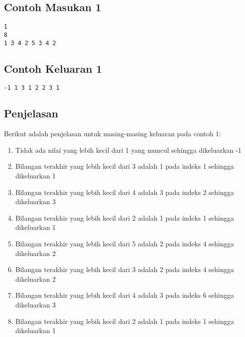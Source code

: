 \documentclass{article}
\begin{document}
\begin{multicols}{2}
\subsection*{Contoh Masukan 1}
\begin{lstlisting}
1
8
1 3 4 2 5 3 4 2
\end{lstlisting}
\columnbreak
\subsection*{Contoh Keluaran 1}
\begin{lstlisting}
-1 1 3 1 2 2 3 1
\end{lstlisting}
\vfill
\null
\end{multicols}


\subsection*{Penjelasan}

Berikut adalah penjelasan untuk masing-masing keluaran pada contoh 1:

\begin{enumerate}
\item Tidak ada nilai yang lebih kecil dari 1 yang muncul sehingga dikeluarkan -1
\item Bilangan terakhir yang lebih kecil dari 3 adalah 1 pada indeks 1 sehingga dikeluarkan 1
\item Bilangan terakhir yang lebih kecil dari 4 adalah 3 pada indeks 2 sehingga dikeluarkan 3
\item Bilangan terakhir yang lebih kecil dari 2 adalah 1 pada indeks 1 sehingga dikeluarkan 1
\item Bilangan terakhir yang lebih kecil dari 5 adalah 2 pada indeks 4 sehingga dikeluarkan 2
\item Bilangan terakhir yang lebih kecil dari 3 adalah 2 pada indeks 4 sehingga dikeluarkan 2
\item Bilangan terakhir yang lebih kecil dari 4 adalah 3 pada indeks 6 sehingga dikeluarkan 3
\item Bilangan terakhir yang lebih kecil dari 2 adalah 1 pada indeks 1 sehingga dikeluarkan 1
\end{enumerate}
\end{document}
